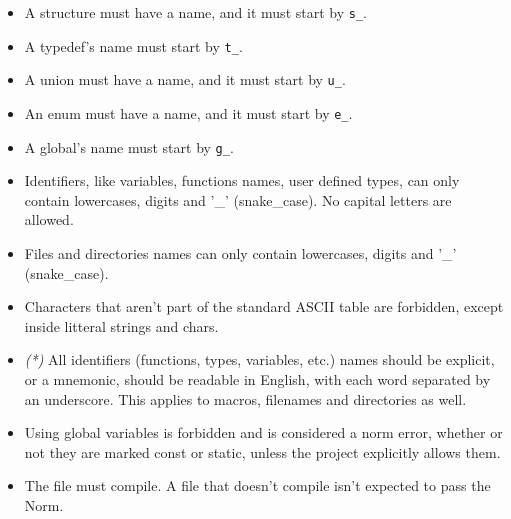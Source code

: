 \documentclass{42-en}
\begin{document}
        \begin{itemize}

            \item A structure must have a name, and it must start by
                \texttt{s\_}.

            \item A typedef's name must start by
                \texttt{t\_}.

            \item A union must have a name, and it must start by \texttt{u\_}.

            \item An enum must have a name, and it must start by \texttt{e\_}.

            \item A global's name must start by \texttt{g\_}.

            \item Identifiers, like variables, functions names, user defined types,
              can only contain lowercases, digits and '\_' (snake\_case). No capital letters are allowed.

            \item Files and directories names can only contain lowercases, digits and
                '\_' (snake\_case).

            \item Characters that aren't part of the standard
                ASCII table are forbidden, except inside litteral strings and chars.

            \item \textit{(*)} All identifiers (functions, types,
              variables, etc.) names should be explicit, or a mnemonic,
              should be readable in English, with each word separated by an underscore.
              This applies to macros, filenames and directories as well.

            \item Using global variables is forbidden and is considered a norm
            error, whether or not they are marked const or static, unless the
            project explicitly allows them.

            \item The file must compile. A file that doesn't compile isn't expected
                to pass the Norm.
        \end{itemize}
\newpage

\end{document}
